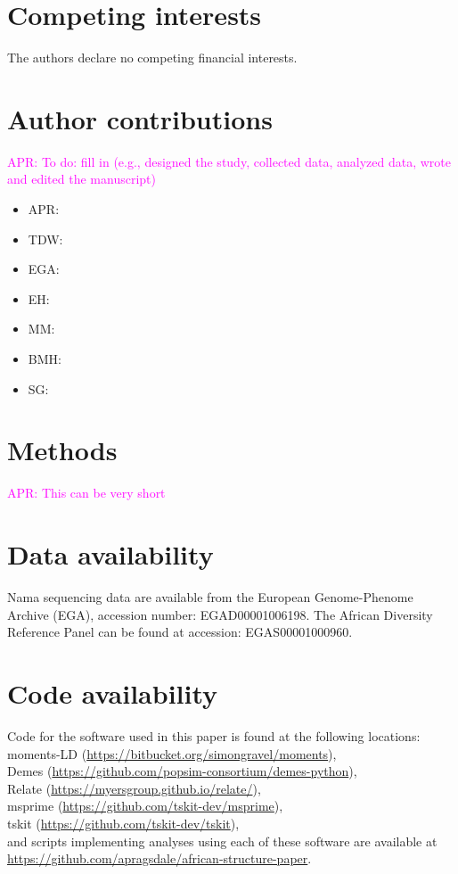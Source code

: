 \documentclass[]{article}
\newcommand{\aprcomment}[1]{{\textcolor{magenta}{APR: #1}}}
\begin{document}
\section*{Competing interests}
The authors declare no competing financial interests.

\section*{Author contributions}
\aprcomment{To do: fill in (e.g., designed the study, collected data,
analyzed data, wrote and edited the manuscript)}
\begin{itemize}
    \item APR:
    \item TDW:
    \item EGA: 
    \item EH:
    \item MM:
    \item BMH:
    \item SG:
\end{itemize}

\section*{Methods}

\aprcomment{This can be very short}

\section*{Data availability}

Nama sequencing data are available from the European Genome-Phenome Archive (EGA),
accession number: EGAD00001006198. The African Diversity Reference Panel can be
found at accession: EGAS00001000960.

\section*{Code availability}

Code for the software used in this paper is found at the following locations:\\
moments-LD (\url{https://bitbucket.org/simongravel/moments}),\\
Demes (\url{https://github.com/popsim-consortium/demes-python}),\\
Relate (\url{https://myersgroup.github.io/relate/}),\\
msprime (\url{https://github.com/tskit-dev/msprime}),\\
tskit (\url{https://github.com/tskit-dev/tskit}),\\
and scripts implementing analyses using each of these software are available at\\
\url{https://github.com/apragsdale/african-structure-paper}.
\end{document}
